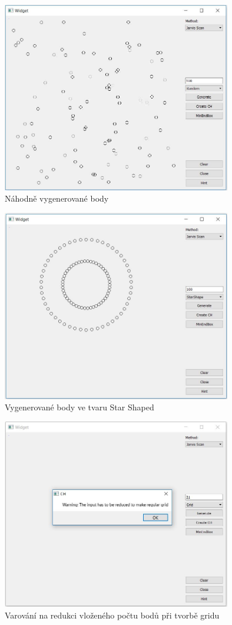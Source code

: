 \documentclass[a4paper, 12pt]{article}
\begin{document}
\begin{figure}[h!]
	\centering
	\includegraphics[width=10cm]{random.jpg}
	\caption{Náhodně vygenerované body}
\end{figure}

\begin{figure}[h!]
	\centering
	\includegraphics[width=10cm]{star_shaped.jpg}
	\caption{Vygenerované body ve tvaru Star Shaped}
\end{figure}

\begin{figure}[h!]
	\centering
	\includegraphics[width=10cm]{warning_grid.jpg}
	\caption{Varování na redukci vloženého počtu bodů při tvorbě gridu }
\end{figure}
\end{document}
